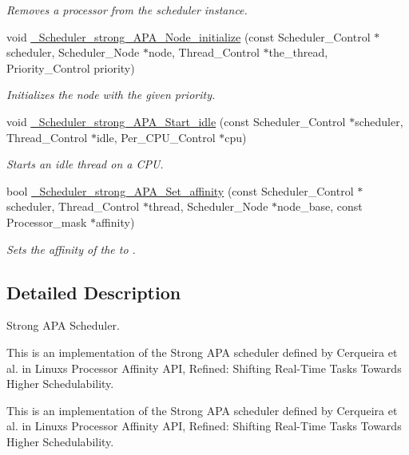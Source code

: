 \begin{DoxyCompactItemize}
\begin{DoxyCompactList}\small\item\em Removes a processor from the scheduler instance. \end{DoxyCompactList}\item 
void \hyperlink{group__RTEMSScoreSchedulerStrongAPA_ga1cde4345d4dc0b5a37a696fa446bb47e}{\+\_\+\+Scheduler\+\_\+strong\+\_\+\+A\+P\+A\+\_\+\+Node\+\_\+initialize} (const Scheduler\+\_\+\+Control $\ast$scheduler, Scheduler\+\_\+\+Node $\ast$node, Thread\+\_\+\+Control $\ast$the\+\_\+thread, Priority\+\_\+\+Control priority)
\begin{DoxyCompactList}\small\item\em Initializes the node with the given priority. \end{DoxyCompactList}\item 
void \hyperlink{group__RTEMSScoreSchedulerStrongAPA_ga218140a63c8168bd7a031ecd1622ac70}{\+\_\+\+Scheduler\+\_\+strong\+\_\+\+A\+P\+A\+\_\+\+Start\+\_\+idle} (const Scheduler\+\_\+\+Control $\ast$scheduler, Thread\+\_\+\+Control $\ast$idle, Per\+\_\+\+C\+P\+U\+\_\+\+Control $\ast$cpu)
\begin{DoxyCompactList}\small\item\em Starts an idle thread on a C\+PU. \end{DoxyCompactList}\item 
bool \hyperlink{group__RTEMSScoreSchedulerStrongAPA_ga63ef624a9881cf77a2b1eef2c6f05223}{\+\_\+\+Scheduler\+\_\+strong\+\_\+\+A\+P\+A\+\_\+\+Set\+\_\+affinity} (const Scheduler\+\_\+\+Control $\ast$scheduler, Thread\+\_\+\+Control $\ast$thread, Scheduler\+\_\+\+Node $\ast$node\+\_\+base, const Processor\+\_\+mask $\ast$affinity)
\begin{DoxyCompactList}\small\item\em Sets the affinity of the  to . \end{DoxyCompactList}\end{DoxyCompactItemize}


\subsection{Detailed Description}
Strong A\+PA Scheduler. 

This is an implementation of the Strong A\+PA scheduler defined by Cerqueira et al. in Linux\textquotesingle{}s Processor Affinity A\+PI, Refined\+: Shifting Real-\/\+Time Tasks Towards Higher Schedulability.

This is an implementation of the Strong A\+PA scheduler defined by Cerqueira et al. in Linux\textquotesingle{}s Processor Affinity A\+PI, Refined\+: Shifting Real-\/\+Time Tasks Towards Higher Schedulability. 

